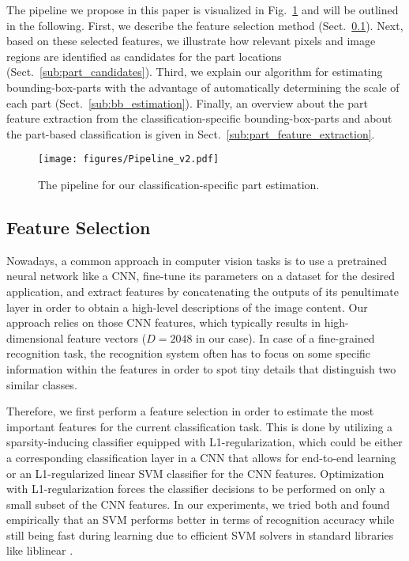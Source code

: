 \documentclass[runningheads]{llncs}
\begin{document}
The pipeline we propose in this paper is visualized in Fig.~\ref{fig:pipeline} and will be outlined in the following.
First, we describe the feature selection method (Sect.~\ref{sub:feature_selection}).
Next, based on these selected features, we illustrate how relevant pixels and image regions are identified as candidates for the part locations (Sect.~\ref{sub:part_candidates}).
Third, we explain our algorithm for estimating bounding-box-parts with the advantage of automatically determining the scale of each part (Sect.~\ref{sub:bb_estimation}).
Finally, an overview about the part feature extraction from the classification-specific bounding-box-parts and about the part-based classification is given in Sect.~\ref{sub:part_feature_extraction}.

\begin{figure}[t]
	\centering
	\texttt{[image: figures/Pipeline\_v2.pdf]}
	\caption{The pipeline for our classification-specific part estimation.}
	\label{fig:pipeline}
\end{figure}

\subsection{Feature Selection}
\label{sub:feature_selection}
\vspace{-.1cm}

Nowadays, a common approach in computer vision tasks is to use a pretrained neural network like a CNN, fine-tune its parameters on a dataset for the desired application, and extract features by concatenating the outputs of its penultimate layer in order to obtain a high-level descriptions of the image content.
Our approach relies on those CNN features, which typically results in high-dimensional feature vectors ($D=2048$ in our case).
In case of a fine-grained recognition task, the recognition system often has to focus on some specific information within the features in order to spot tiny details that distinguish two similar classes.

Therefore, we first perform a feature selection in order to estimate the most important features for the current classification task.
This is done by utilizing a sparsity-inducing classifier equipped with L1-regularization, which could be either a corresponding classification layer in a CNN that allows for end-to-end learning or an L1-regularized linear SVM classifier for the CNN features.
Optimization with L1-regularization forces the classifier decisions to be performed on only a small subset of the CNN features.
In our experiments, we tried both and found empirically that an SVM performs better in terms of recognition accuracy while still being fast during learning due to efficient SVM solvers in standard libraries like liblinear \cite{fan2008liblinear}.
\end{document}
